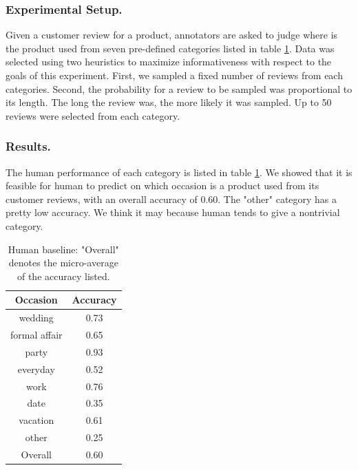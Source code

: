 \documentclass[sigconf]{acmart}
\begin{document}
\subsubsection{Experimental Setup.}

Given a customer review for a product, annotators are asked to judge where is the product used from seven pre-defined categories listed in table \ref{table:human-baseline}. Data was selected using two heuristics to maximize informativeness with respect to the goals of this experiment. First, we sampled a fixed number of reviews from each categories. Second, the probability for a review to be sampled was proportional to its length. The long the review was, the more likely it was sampled. Up to 50 reviews were selected from each category.

\subsubsection{Results.}

The human performance of each category is listed in table \ref{table:human-baseline}.
We showed that it is feasible for human to predict on which occasion is a product used from its customer reviews, with an overall accuracy of 0.60. The "other" category has a pretty low accuracy. We think it may because human tends to give a nontrivial category.

\begin{table}[t]
\centering %
\begin{tabular}{c c} %
\hline\hline %
Occasion & Accuracy \\ [0.5ex] %
\hline %
wedding &  0.73\\ %
formal affair & 0.65 \\
party & 0.93\\
everyday &  0.52\\
work &  0.76\\ 
date &  0.35\\ 
vacation & 0.61 \\ 
other & 0.25 \\
\hline %
Overall & 0.60\\
\hline

\end{tabular}
\caption{Human baseline: "Overall" denotes the micro-average of the accuracy listed.}
\label{table:human-baseline} %
\end{table}
\end{document}
